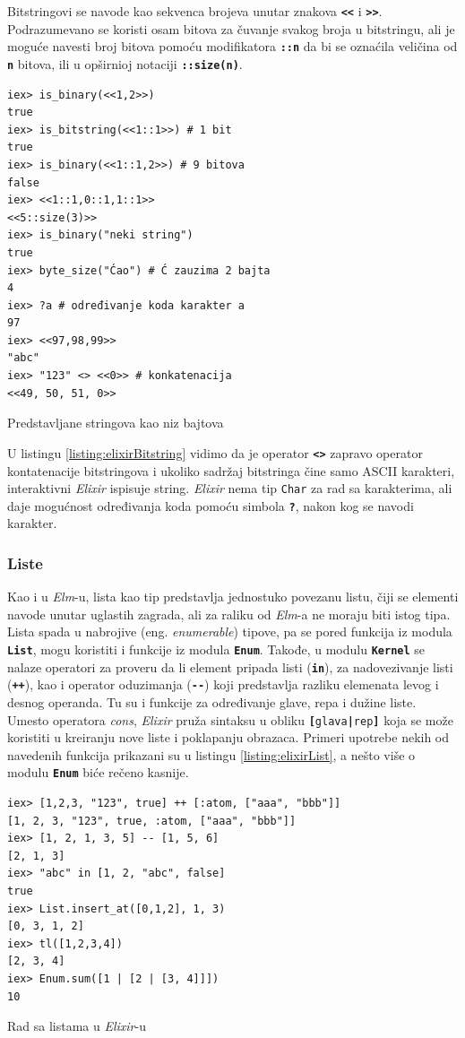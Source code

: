 \documentclass[12pt,oneside]{memoir}
\begin{document}
Bitstringovi se navode kao sekvenca brojeva unutar znakova
\texttt{\textbf{<\smallskip<}} i \texttt{\textbf{>\smallskip>}}. Podrazumevano se koristi
osam bitova za čuvanje svakog broja u bitstringu, ali je moguće navesti broj bitova pomoću
modifikatora \texttt{\textbf{::n}} da bi se oznaćila veličina od \texttt{\textbf{n}} bitova,
ili u opširnioj notaciji \texttt{\textbf{::size(n)}}.
\begin{listing}[!h]
\begin{verbatim}
iex> is_binary(<<1,2>>)
true
iex> is_bitstring(<<1::1>>) # 1 bit
true
iex> is_binary(<<1::1,2>>) # 9 bitova
false
iex> <<1::1,0::1,1::1>>
<<5::size(3)>>
iex> is_binary("neki string")
true
iex> byte_size("Ćao") # Ć zauzima 2 bajta
4
iex> ?a # određivanje koda karakter a
97
iex> <<97,98,99>>  
"abc"
iex> "123" <> <<0>> # konkatenacija
<<49, 50, 51, 0>>
\end{verbatim}
\caption{Predstavljane stringova kao niz bajtova}
\label{listing:elixirBitstring}
\end{listing}
U listingu \ref{listing:elixirBitstring} vidimo da je operator \texttt{\textbf{<>}} zapravo
operator kontatenacije bitstringova i ukoliko sadržaj bitstringa čine samo ASCII
karakteri, interaktivni \emph{Elixir} ispisuje string. \emph{Elixir} nema tip \texttt{Char} za rad sa
karakterima, ali daje mogućnost određivanja koda pomoću simbola \texttt{\textbf{?}}, nakon 
kog se navodi karakter. 

\subsubsection{Liste}
Kao i u \emph{Elm}-u, lista kao tip predstavlja jednostuko povezanu listu, čiji se elementi navode
unutar uglastih zagrada, ali za raliku od \emph{Elm}-a ne moraju biti istog tipa. Lista spada u 
nabrojive (eng. \emph{enumerable}) tipove, pa se pored funkcija iz modula \texttt{\textbf{List}},
mogu koristiti i funkcije iz modula \texttt{\textbf{Enum}}. Takođe, u modulu \texttt{\textbf{Kernel}}
se nalaze operatori za proveru da li element pripada listi (\texttt{\textbf{in}}), za nadovezivanje
listi (\texttt{\textbf{++}}), kao i operator oduzimanja (\texttt{\textbf{-{}-}}) koji predstavlja
razliku elemenata levog i desnog operanda. Tu su i funkcije za određivanje
glave, repa i dužine liste. Umesto operatora \emph{cons}, \emph{Elixir} pruža sintaksu u obliku
\texttt{\textbf{[}glava\textbf{|}rep\textbf{]}} koja se može koristiti u kreiranju nove
liste i poklapanju obrazaca. Primeri upotrebe nekih od navedenih funkcija prikazani su u
listingu \ref{listing:elixirList}, a nešto više o modulu \texttt{\textbf{Enum}} biće rečeno kasnije. 
\begin{listing}[h]
\begin{verbatim}
iex> [1,2,3, "123", true] ++ [:atom, ["aaa", "bbb"]]
[1, 2, 3, "123", true, :atom, ["aaa", "bbb"]]
iex> [1, 2, 1, 3, 5] -- [1, 5, 6]
[2, 1, 3]
iex> "abc" in [1, 2, "abc", false]
true
iex> List.insert_at([0,1,2], 1, 3)
[0, 3, 1, 2]
iex> tl([1,2,3,4])
[2, 3, 4]
iex> Enum.sum([1 | [2 | [3, 4]]])
10
\end{verbatim}
\caption{Rad sa listama u \emph{Elixir}-u}
\label{listing:elixirList}
\end{listing}
\end{document}
